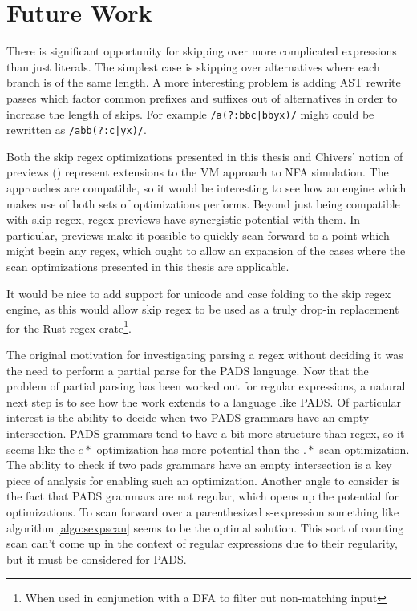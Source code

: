 \chapter{Future Work}
\label{chapter:futurework}

There is significant opportunity for skipping over more complicated
expressions than just literals. The simplest case is skipping over
alternatives where each branch is of the same length. A more interesting
problem is adding AST rewrite passes which factor common prefixes and
suffixes out of alternatives in order to increase the length of skips.
For example \verb'/a(?:bbc|bbyx)/' might could be rewritten as
\verb'/abb(?:c|yx)/'.

Both the skip regex optimizations presented in this thesis and
Chivers' notion of previews (\cite{Chivers2016}) represent
extensions to the VM approach to NFA simulation. The approaches
are compatible, so it would be interesting to see how an engine
which makes use of both sets of optimizations performs. Beyond
just being compatible with skip regex, regex previews have
synergistic potential with them. In particular, previews make
it possible to quickly scan forward to a point which might begin
any regex, which ought to allow an expansion of the cases where
the scan optimizations presented in this thesis are applicable.

It would be nice to add support for unicode and case folding to
the skip regex engine, as this would allow skip regex to be used
as a truly drop-in replacement for the Rust regex crate\footnote{
When used in conjunction with a DFA to filter out non-matching
input}.

The original motivation for investigating parsing a regex without
deciding it was the need to perform a partial parse for the PADS
language. Now that the problem of partial parsing has been worked
out for regular expressions, a natural next step is to see how
the work extends to a language like PADS. Of particular interest
is the ability to decide when two PADS grammars have an empty
intersection. PADS grammars tend to have a bit more structure
than regex, so it seems like the $e*$ optimization has more
potential than the $.*$ scan optimization. The ability to check
if two pads grammars have an empty intersection is a key piece
of analysis for enabling such an optimization. Another angle
to consider is the fact that PADS grammars are not regular,
which opens up the potential for optimizations. To scan
forward over a parenthesized s-expression something like
algorithm \ref{algo:sexpscan} seems to be the
optimal solution. This sort of counting scan can't come up
in the context of regular expressions due to their regularity,
but it must be considered for PADS.

